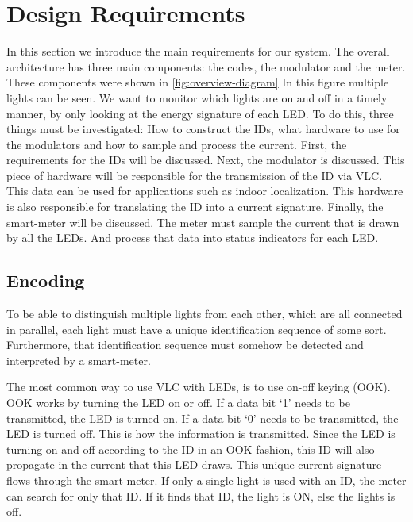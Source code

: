 
\chapter{Design Requirements}
\label{chp:design-requirements}


In this section we introduce the main requirements for our system. The overall architecture has three main components: the codes, the modulator and the meter. 
These components were shown in \autoref{fig:overview-diagram} 
In this figure multiple lights can be seen.
We want to monitor which lights are on and off in a timely manner, by only looking at the energy signature of each LED.
To do this, three things must be investigated: How to construct the IDs, what hardware to use for the modulators and how to sample and process the current.
First, the requirements for the IDs will be discussed.
Next, the modulator is discussed. 
This piece of hardware will be responsible for the transmission of the ID via VLC.
This data can be used for applications such as indoor localization.
This hardware is also responsible for translating the ID into a current signature.
Finally, the smart-meter will be discussed.
The meter must sample the current that is drawn by all the LEDs.
And process that data into status indicators for each LED.








	\section{Encoding}

	To be able to distinguish multiple lights from each other, which are all connected in parallel, each light must have a unique identification sequence of some sort.
	Furthermore, that identification sequence must somehow be detected and interpreted by a smart-meter.


	The most common way to use VLC with LEDs, is to use on-off keying (OOK).
	OOK works by turning the LED on or off.
	If a data bit `1' needs to be transmitted, the LED is turned on.
	If a data bit `0' needs to be transmitted, the LED is turned off.
	This is how the information is transmitted.
	Since the LED is turning on and off according to the ID in an OOK fashion, this ID will also propagate in the current that this LED draws.
	This unique current signature flows through the smart meter.
	If only a single light is used with an ID, the meter can search for only that ID.
	If it finds that ID, the light is ON, else the lights is off.



